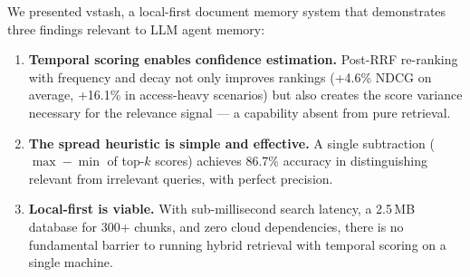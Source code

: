 \documentclass[11pt,a4paper]{article}
\begin{document}
We presented vstash, a local-first document memory system that
demonstrates three findings relevant to LLM agent memory:

\begin{enumerate}
  \item \textbf{Temporal scoring enables confidence estimation.}
    Post-RRF re-ranking with frequency and decay not only improves
    rankings (+4.6\% NDCG on average, +16.1\% in access-heavy
    scenarios) but also creates the score variance necessary for
    the relevance signal --- a capability absent from pure retrieval.

  \item \textbf{The spread heuristic is simple and effective.}
    A single subtraction ($\max - \min$ of top-$k$ scores) achieves
    86.7\% accuracy in distinguishing relevant from irrelevant
    queries, with perfect precision.

  \item \textbf{Local-first is viable.}  With sub-millisecond search
    latency, a 2.5\,MB database for 300+ chunks, and zero cloud
    dependencies, there is no fundamental barrier to running hybrid
    retrieval with temporal scoring on a single machine.
\end{enumerate}



\end{document}
